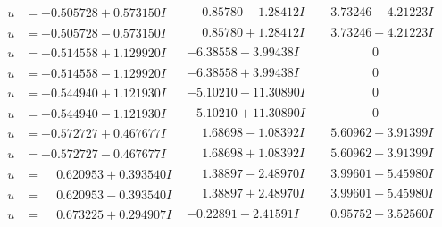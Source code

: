 \documentclass[1p]{elsarticle_modified}
\theoremstyle{definition}
\begin{document}
$$\begin{array}{c|c|c}
\begin{aligned}
u &= -0.505728 + 0.573150 I\end{aligned}
 & \phantom{-}0.85780 - 1.28412 I & \phantom{-}3.73246 + 4.21223 I \\ \hline\begin{aligned}
u &= -0.505728 - 0.573150 I\end{aligned}
 & \phantom{-}0.85780 + 1.28412 I & \phantom{-}3.73246 - 4.21223 I \\ \hline\begin{aligned}
u &= -0.514558 + 1.129920 I\end{aligned}
 & -6.38558 - 3.99438 I & \phantom{-0.000000 } 0 \\ \hline\begin{aligned}
u &= -0.514558 - 1.129920 I\end{aligned}
 & -6.38558 + 3.99438 I & \phantom{-0.000000 } 0 \\ \hline\begin{aligned}
u &= -0.544940 + 1.121930 I\end{aligned}
 & -5.10210 - 11.30890 I & \phantom{-0.000000 } 0 \\ \hline\begin{aligned}
u &= -0.544940 - 1.121930 I\end{aligned}
 & -5.10210 + 11.30890 I & \phantom{-0.000000 } 0 \\ \hline\begin{aligned}
u &= -0.572727 + 0.467677 I\end{aligned}
 & \phantom{-}1.68698 - 1.08392 I & \phantom{-}5.60962 + 3.91399 I \\ \hline\begin{aligned}
u &= -0.572727 - 0.467677 I\end{aligned}
 & \phantom{-}1.68698 + 1.08392 I & \phantom{-}5.60962 - 3.91399 I \\ \hline\begin{aligned}
u &= \phantom{-}0.620953 + 0.393540 I\end{aligned}
 & \phantom{-}1.38897 - 2.48970 I & \phantom{-}3.99601 + 5.45980 I \\ \hline\begin{aligned}
u &= \phantom{-}0.620953 - 0.393540 I\end{aligned}
 & \phantom{-}1.38897 + 2.48970 I & \phantom{-}3.99601 - 5.45980 I \\ \hline\begin{aligned}
u &= \phantom{-}0.673225 + 0.294907 I\end{aligned}
 & -0.22891 - 2.41591 I & \phantom{-}0.95752 + 3.52560 I \\ \hline\begin{aligned}

\end{aligned}
\end{array}$$
\end{document}
